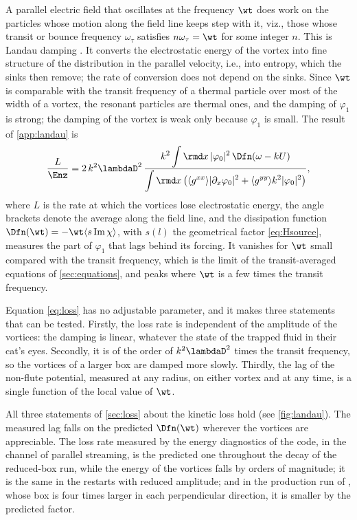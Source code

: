 A parallel electric field that oscillates at the frequency \(\wt\) does work on the particles whose motion along the field line keeps step with it, viz., those whose transit or bounce frequency \(\omega_\tau\) satisfies \(n\omega_\tau = \wt\) for some integer \(n\). This is Landau damping \citep{Landau1946}. It converts the electrostatic energy of the vortex into fine structure of the distribution in the parallel velocity, i.e., into entropy, which the sinks then remove; the rate of conversion does not depend on the sinks. Since \(\wt\) is comparable with the transit frequency of a thermal particle over most of the width of a vortex, the resonant particles are thermal ones, and the damping of \(\varphi_1\) is strong; the damping of the vortex is weak only because \(\varphi_1\) is small. The result of \cref{app:landau} is
\begin{equation}
\frac{L}{\Enz} = 2\,k^2\lambdaD^2\,
\frac{\displaystyle k^2\int\rmd x\,|\varphi_0|^2\,\Dfn\!\left(\omega - kU\right)}
{\displaystyle\int\rmd x\left(\langle g^{xx}\rangle|\partial_x\varphi_0|^2 + \langle g^{yy}\rangle k^2|\varphi_0|^2\right)},
\label{eq:loss}
\end{equation}
where \(L\) is the rate at which the vortices lose electrostatic energy, the angle brackets denote the average along the field line, and the dissipation function \(\Dfn(\wt) = -\wt\langle s\operatorname{Im}\chi\rangle\), with \(s(l)\) the geometrical factor \cref{eq:Hsource}, measures the part of \(\varphi_1\) that lags behind its forcing. It vanishes for \(\wt\) small compared with the transit frequency, which is the limit of the transit-averaged equations of \cref{sec:equations}, and peaks where \(\wt\) is a few times the transit frequency.

Equation \cref{eq:loss} has no adjustable parameter, and it makes three statements that can be tested. Firstly, the loss rate is independent of the amplitude of the vortices: the damping is linear, whatever the state of the trapped fluid in their cat's eyes. Secondly, it is of the order of \(k^2\lambdaD^2\) times the transit frequency, so the vortices of a larger box are damped more slowly. Thirdly, the lag of the non-flute potential, measured at any radius, on either vortex and at any time, is a single function of the local value of \(\wt\).

All three statements of \cref{sec:loss} about the kinetic loss hold (see \cref{fig:landau}). The measured lag falls on the predicted \(\Dfn(\wt)\) wherever the vortices are appreciable. The loss rate measured by the energy diagnostics of the code, in the channel of parallel streaming, is the predicted one throughout the decay of the reduced-box run, while the energy of the vortices falls by orders of magnitude; it is the same in the restarts with reduced amplitude; and in the production run of \citet{KennedyPlunkLetter}, whose box is four times larger in each perpendicular direction, it is smaller by the predicted factor.

